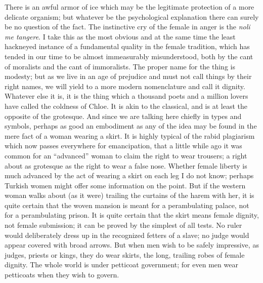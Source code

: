 \documentclass{book}
\begin{document}
There is an awful armor of ice which may be the legitimate protection of a more delicate organism; but whatever be the psychological explanation there can surely be no question of the fact. The instinctive cry of the female in anger is the \emph{noli me tangere}. I take this as the most obvious and at the same time the least hackneyed instance of a fundamental quality in the female tradition, which has tended in our time to be almost immeasurably misunderstood, both by the cant of moralists and the cant of immoralists. The proper name for the thing is modesty; but as we live in an age of prejudice and must not call things by their right names, we will yield to a more modern nomenclature and call it dignity. Whatever else it is, it is the thing which a thousand poets and a million lovers have called the coldness of Chloe. It is akin to the classical, and is at least the opposite of the grotesque. And since we are talking here chiefly in types and symbols, perhaps as good an embodiment as any of the idea may be found in the mere fact of a woman wearing a skirt. It is highly typical of the rabid plagiarism which now passes everywhere for emancipation, that a little while ago it was common for an “advanced” woman to claim the right to wear trousers; a right about as grotesque as the right to wear a false nose. Whether female liberty is much advanced by the act of wearing a skirt on each leg I do not know; perhaps Turkish women might offer some information on the point. But if the western woman walks about (as it were) trailing the curtains of the harem with her, it is quite certain that the woven mansion is meant for a perambulating palace, not for a perambulating prison. It is quite certain that the skirt means female dignity, not female submission; it can be proved by the simplest of all tests. No ruler would deliberately dress up in the recognized fetters of a slave; no judge would appear covered with broad arrows. But when men wish to be safely impressive, as judges, priests or kings, they do wear skirts, the long, trailing robes of female dignity. The whole world is under petticoat government; for even men wear petticoats when they wish to govern.
\end{document}
